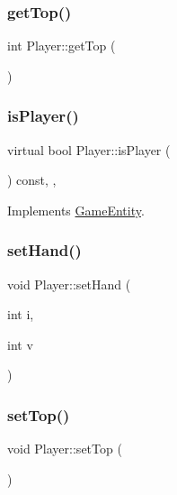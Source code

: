\mbox{\label{class_player_a30bb76d5226dbba96a318fc4e9fcf537}} 
\subsubsection{\texorpdfstring{get\+Top()}{getTop()}}
{\footnotesize\ttfamily int Player\+::get\+Top (\begin{DoxyParamCaption}{ }\end{DoxyParamCaption})}

\mbox{\label{class_player_a95535954a888f7e37896d26d12ae2975}} 
\subsubsection{\texorpdfstring{is\+Player()}{isPlayer()}}
{\footnotesize\ttfamily virtual bool Player\+::is\+Player (\begin{DoxyParamCaption}{ }\end{DoxyParamCaption}) const\hspace{0.3cm}{\ttfamily [inline]}, {\ttfamily [override]}, {\ttfamily [virtual]}}



Implements \mbox{\hyperlink{class_game_entity_a6528d6c01269ce943d690ca607e4cff8}{Game\+Entity}}.

\mbox{\label{class_player_a38bb763292ccae8492422a2f2c15be5f}} 
\subsubsection{\texorpdfstring{set\+Hand()}{setHand()}}
{\footnotesize\ttfamily void Player\+::set\+Hand (\begin{DoxyParamCaption}\item[{int}]{i,  }\item[{int}]{v }\end{DoxyParamCaption})}

\mbox{\label{class_player_a08590552e6997c5ae39a7af8463b8763}} 
\subsubsection{\texorpdfstring{set\+Top()}{setTop()}}
{\footnotesize\ttfamily void Player\+::set\+Top (\begin{DoxyParamCaption}{ }\end{DoxyParamCaption})}

